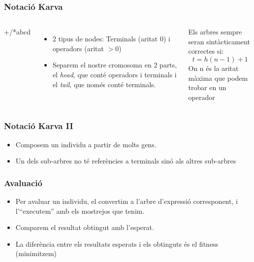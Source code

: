 \documentclass{beamer}
\begin{document}
\begin{frame}
	\frametitle{Notació Karva}
	\begin{columns}[c]
		+/*abcd


		\begin{itemize}
			\item 2 tipus de nodes: Terminals (aritat 0) i operadors (aritat
			$>0$)
			\item Separem el nostre cromosoma en 2 parts, el \emph{head}, que
			conté operadors i terminals i el \emph{tail}, que només conté
			terminals.
		\end{itemize}
		\begin{block}{Els arbres sempre seran sintàcticament correctes si:}
			$$ t =  h (n-1) + 1 $$
			On n és la aritat màxima que podem trobar en un operador
		\end{block}
	\end{columns}
\end{frame}

\begin{frame}
	\frametitle{Notació Karva II}
	\begin{itemize}
		\item Composem un individu a partir de molts gens.
		\item Un dels sub-arbres no té referències a terminals sinó als altres sub-arbres
	\end{itemize}
\end{frame}

\begin{frame}
	\frametitle{Avaluació}
	\begin{itemize}
		\item Per avaluar un individu, el convertim a l'arbre d'expressió corresponent, i
			l'``executem'' amb els mostrejos que tenim.
		\item Comparem el resultat obtingut amb l'esperat.
		\item La diferència entre els resultats esperats i els obtinguts és el fitness (minimitzem)
	\end{itemize}
\end{frame}
\end{document}
